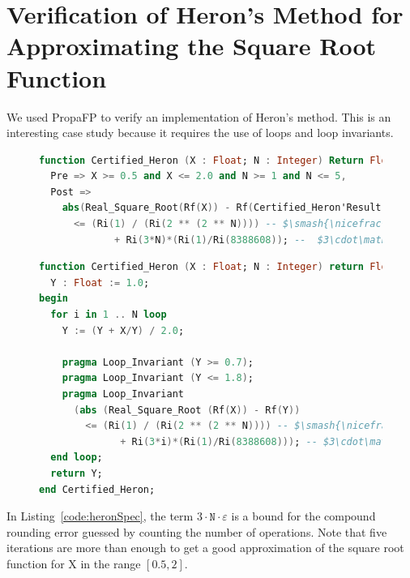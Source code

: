 \documentclass[runningheads]{llncs}
\begin{document}
\section{Verification of Heron's Method for Approximating the Square Root Function}\label{sec:verifyHeron}
We used PropaFP to verify an implementation of Heron's method.
This is an interesting case study because it requires the use of loops and loop invariants.

\begin{figure}[ht]
\vspace{-2ex}
\begin{lstlisting}[caption=Heron's Method Specification, language=ada, label={code:heronSpec},basicstyle=\fontsize{7.5}{9pt}\tt]
function Certified_Heron (X : Float; N : Integer) Return Float with
  Pre => X >= 0.5 and X <= 2.0 and N >= 1 and N <= 5,
  Post =>
    abs(Real_Square_Root(Rf(X)) - Rf(Certified_Heron'Result))
      <= (Ri(1) / (Ri(2 ** (2 ** N)))) -- $\smash{\nicefrac{1}{2^{2^{\mathtt{N}}}}}$ model error
             + Ri(3*N)*(Ri(1)/Ri(8388608)); --  $3\cdot\mathtt{N}\cdot \varepsilon$, rounding error bound
\end{lstlisting}

\begin{lstlisting}[caption=Heron's Method Implementation, language=ada, label={code:heronImpl},basicstyle=\fontsize{7.5}{9pt}\tt]
function Certified_Heron (X : Float; N : Integer) return Float is
  Y : Float := 1.0;
begin
  for i in 1 .. N loop
    Y := (Y + X/Y) / 2.0;

    pragma Loop_Invariant (Y >= 0.7);
    pragma Loop_Invariant (Y <= 1.8);
    pragma Loop_Invariant
      (abs (Real_Square_Root (Rf(X)) - Rf(Y))
        <= (Ri(1) / (Ri(2 ** (2 ** N)))) -- $\smash{\nicefrac{1}{2^{2^{\mathtt{i}}}}}$
              + Ri(3*i)*(Ri(1)/Ri(8388608))); -- $3\cdot\mathtt{i}\cdot \varepsilon$
  end loop;
  return Y;
end Certified_Heron;
\end{lstlisting}
\vspace{-2ex}
\end{figure}

In Listing~\ref{code:heronSpec}, the term $3\cdot\mathtt{N}\cdot \varepsilon$ is a bound for the compound rounding error guessed by counting the number of operations.
Note that five iterations are more than enough to get a good approximation of the square root function for X in the range $[0.5, 2]$.
\end{document}
